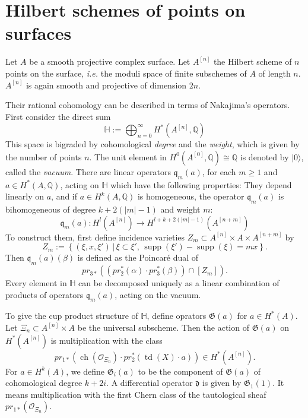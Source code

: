 \documentclass{amsart}
\DeclareMathOperator{\Hilb}{Hilb}
\DeclareMathOperator{\ch}{ch}
\DeclareMathOperator{\td}{td}
\DeclareMathOperator{\supp}{supp}
\newcommand{\hilb}[1]{^{[#1]}}
\newcommand{\ie}{{\it i.e. }}
\newcommand{\vac}{|0\rangle}
\newcommand{\G}{\mathfrak{G}}
\newcommand{\q}{\mathfrak{q}}
\renewcommand{\H}{\mathbb{H}}
\newcommand{\Q}{\mathbb{Q}}
\theoremstyle{plain}
\theoremstyle{definition}
\theoremstyle{remark}
\begin{document}
\section{Hilbert schemes of points on surfaces}
Let $A$ be a smooth projective complex surface. Let $A\hilb{n}$ the Hilbert scheme of $n$ points on the surface, \ie the moduli space of finite subschemes of $A$ of length $n$.
$A\hilb{n}$ is again smooth and projective of dimension $2n$. 

Their rational cohomology can be described in terms of Nakajima's operators. First consider the direct sum
$$
\H := \bigoplus_{n=0}^{\infty} H^*(A\hilb{n},\Q)
$$
This space is bigraded by cohomological \emph{degree} and the \emph{weight}, which is given by the number of points $n$. The unit element in $H^0(A\hilb{0},\Q) \cong \Q$ is denoted by $\vac$, called the \emph{vacuum}.
There are linear operators $\q_m(a)$, for each $m\geq 1$ and $a \in H^*(A,\Q)$, acting on $\H$ which have the following properties: They depend linearly on $a$, and if $a\in H^k(A,\Q)$ is homogeneous, the operator $\q_{m}(a)$ is bihomogeneous of degree $k+2(|m|-1)$ and weight $m$:
$$
\q_{m}(a) : H^l(A\hilb{n}) \rightarrow H^{l+k+2(|m|-1)}(A\hilb{n+m})
$$
To construct them, first define incidence varieties $Z_m\subset A\hilb{n}\times A\times A\hilb{n+m}$ by
$$
Z_m := \left\{(\xi,x,\xi')\, |\, \xi\subset\xi',\, \supp(\xi') -\supp(\xi) = mx \right\}.
$$
Then $\q_m(a)(\beta) $ is defined as the Poincar\'e dual of 
$$
pr_{3*}\left( \left(pr_2^*(\alpha)\cdot pr_3^*(\beta)\right) \cap [Z_m] \right).
$$
Every element in $\H$ can be decomposed uniquely as a linear combination of products of operators $\q_{m}(a)$, acting on the vacuum. 

To give the cup product structure of $\H$, define oprators $\G(a)$ for $a \in H^*(A)$. Let $\Xi_n \subset A\hilb{n}\times A$ be the universal subscheme. Then the action of $\G(a)$ on $H^*(A\hilb{n})$ is multiplication with the class
$$
pr_{1*}\left( \ch(\mathcal{O}_{\Xi_n})\cdot pr_2^*(\td(X)\cdot a) \right) \in H^*(A\hilb{n}).
$$
For $a \in H^k(A)$, we define $\G_i(a)$ to be the component of $\G(a)$ of cohomological degree $k+2i$. A differential operator $\mathfrak{d}$ is given by $\G_1(1)$. It means multiplication with the first Chern class of the tautological sheaf $pr_{1*}\left( \mathcal{O}_{\Xi_n}\right)$.
\end{document}

